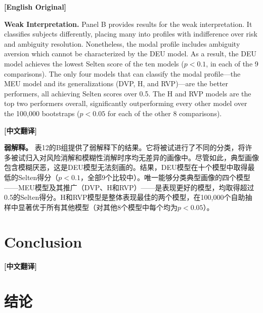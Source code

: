 \documentclass[12pt,a4paper]{ctexart}
\newenvironment{original}{%
  \par\medskip\noindent\textbf{[English Original]}\par\smallskip
  \color{black}\small
}{%
  \par\medskip
}
\newenvironment{translation}{%
  \par\noindent\textbf{[中文翻译]}\par\smallskip
  \color{blue}\small
}{%
  \par\bigskip
}
\theoremstyle{definition}
\theoremstyle{remark}
\begin{document}
\begin{original}
\textbf{Weak Interpretation.} Panel B provides results for the weak interpretation. It classifies subjects differently, placing many into profiles with indifference over risk and ambiguity resolution. Nonetheless, the modal profile includes ambiguity aversion which cannot be characterized by the DEU model. As a result, the DEU model achieves the lowest Selten score of the ten models ($p < 0.1$, in each of the 9 comparisons). The only four models that can classify the modal profile---the MEU model and its generalizations (DVP, H, and RVP)---are the better performers, all achieving Selten scores over 0.5. The H and RVP models are the top two performers overall, significantly outperforming every other model over the 100,000 bootstraps ($p < 0.05$ for each of the other 8 comparisons).
\end{original}
\begin{translation}
\textbf{弱解释。} 表12的B组提供了弱解释下的结果。它将被试进行了不同的分类，将许多被试归入对风险消解和模糊性消解时序均无差异的画像中。尽管如此，典型画像包含模糊厌恶，这是DEU模型无法刻画的。结果，DEU模型在十个模型中取得最低的Selten得分（$p < 0.1$，全部9个比较中）。唯一能够分类典型画像的四个模型——MEU模型及其推广（DVP、H和RVP）——是表现更好的模型，均取得超过0.5的Selten得分。H和RVP模型是整体表现最佳的两个模型，在100,000个自助抽样中显著优于所有其他模型（对其他8个模型中每个均为$p < 0.05$）。
\end{translation}

\newpage

\section{Conclusion}
\begin{translation}
\section*{结论}
\end{translation}
\end{document}

